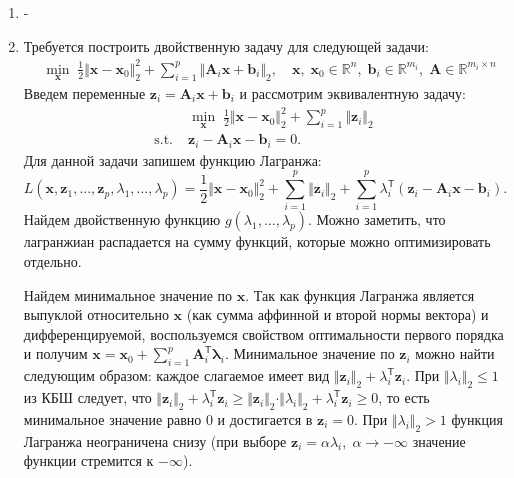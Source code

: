 \documentclass[a4paper,12pt]{article}
\renewcommand{\leq}{\leqslant}
\renewcommand{\geq}{\geqslant}
\renewcommand{\top}{\mathsf{T}}
\begin{document}
\begin{enumerate}
\item -

\item Требуется построить двойственную задачу для следующей задачи:
\begin{equation*}
	\begin{aligned}
		& \min\limits_{\mathbf{x}}\; 
		\frac{1}{2}\Vert\mathbf{x}-\mathbf{x}_0\Vert_2^2 + \sum\limits_{i=1}^p\Vert\mathbf{A}_i\mathbf{x} + \mathbf{b}_i\Vert_2,\quad \mathbf{x},\;\mathbf{x}_0\in\mathbb{R}^n,\;\mathbf{b}_i\in\mathbb{R}^{m_i},\;\mathbf{A}\in\mathbb{R}^{m_i\times n}
	\end{aligned}
\end{equation*}
Введем переменные $\mathbf{z}_i = \mathbf{A}_i\mathbf{x} + \mathbf{b}_i$ и рассмотрим эквивалентную задачу:
\begin{equation*}
	\begin{aligned}
		& \min\limits_{\mathbf{x}}\; 
		\frac{1}{2}\Vert\mathbf{x}-\mathbf{x}_0\Vert_2^2 + \sum\limits_{i=1}^p\Vert\mathbf{z}_i\Vert_2\\
		\text{s.t.}\; & \mathbf{z}_i - \mathbf{A}_i\mathbf{x} - \mathbf{b}_i = 0.
	\end{aligned}
\end{equation*}
Для данной задачи запишем функцию Лагранжа:
$$
L(\mathbf{x},\mathbf{z}_1,...,\mathbf{z}_p,\lambda_1,...,\lambda_p) = \frac{1}{2}\Vert\mathbf{x}-\mathbf{x}_0\Vert_2^2 + \sum\limits_{i=1}^p\Vert\mathbf{z}_i\Vert_2 + \sum\limits_{i=1}^p\lambda_i^\top(\mathbf{z}_i - \mathbf{A}_i\mathbf{x} - \mathbf{b}_i).
$$
Найдем двойственную функцию $g(\lambda_1,...,\lambda_p)$. Можно заметить, что лагранжиан распадается на сумму функций, которые можно оптимизировать отдельно.

Найдем минимальное значение по $\mathbf{x}$. Так как функция Лагранжа является выпуклой относительно   $\mathbf{x}$ (как сумма аффинной и второй нормы вектора) и дифференцируемой, воспользуемся свойством оптимальности первого порядка и получим $\mathbf{x}=\mathbf{x}_0 + \sum_{i=1}^p\mathbf{A}_i^\top\mathbf{\lambda}_i$. Минимальное значение по $\mathbf{z}_i$ можно найти следующим образом: каждое слагаемое имеет вид $\Vert\mathbf{z}_i\Vert_2 + \lambda_i^\top\mathbf{z}_i $. При $\Vert\lambda_i\Vert_2\leq 1$ из КБШ следует, что $\Vert\mathbf{z}_i\Vert_2 + \lambda_i^\top\mathbf{z}_i \geq \Vert\mathbf{z}_i\Vert_2 \cdot \Vert\lambda_i\Vert_2+ \lambda_i^\top\mathbf{z}_i \geq 0$, то есть минимальное значение равно 0 и достигается в $\mathbf{z}_i=0$. При $\Vert\lambda_i\Vert_2 > 1$ функция Лагранжа неограничена снизу (при выборе $\mathbf{z}_i = \alpha \lambda_i,\;\alpha \rightarrow -\infty$ значение функции стремится к $-\infty$).


\end{enumerate}
\end{document}
